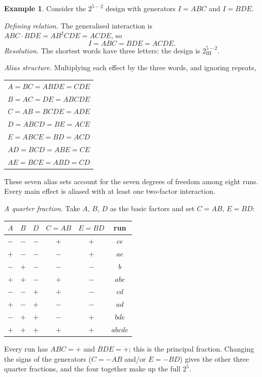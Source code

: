 \documentclass[11pt,a4paper]{article}
\numberwithin{equation}{section}
\theoremstyle{definition}
\newtheorem{exa}[thm]{Example}
\begin{document}
\begin{exa}\label{exa:quarter}
Consider the $2^{5-2}$ design with generators $I = ABC$ and $I = BDE$.

\emph{Defining relation.} The generalised interaction is $ABC \cdot BDE = AB^2CDE = ACDE$, so
\[
I = ABC = BDE = ACDE .
\]
\emph{Resolution.} The shortest words have three letters: the design is $2^{5-2}_{\mathrm{III}}$.

\emph{Alias structure.} Multiplying each effect by the three words, and ignoring repeats,
\begin{center}
\begin{tabular}{l}
$A = BC = ABDE = CDE$ \\
$B = AC = DE = ABCDE$ \\
$C = AB = BCDE = ADE$ \\
$D = ABCD = BE = ACE$ \\
$E = ABCE = BD = ACD$ \\
$AD = BCD = ABE = CE$ \\
$AE = BCE = ABD = CD$
\end{tabular}
\end{center}
These seven alias sets account for the seven degrees of freedom among eight runs. Every main effect is aliased with at least one two-factor
interaction.

\emph{A quarter fraction.} Take $A$, $B$, $D$ as the basic factors and set $C = AB$, $E = BD$:
\begin{center}
\begin{tabular}{ccc|cc|c}
$A$ & $B$ & $D$ & $C = AB$ & $E = BD$ & run \\
\hline
$-$ & $-$ & $-$ & $+$ & $+$ & $ce$ \\
$+$ & $-$ & $-$ & $-$ & $+$ & $ae$ \\
$-$ & $+$ & $-$ & $-$ & $-$ & $b$ \\
$+$ & $+$ & $-$ & $+$ & $-$ & $abc$ \\
$-$ & $-$ & $+$ & $+$ & $-$ & $cd$ \\
$+$ & $-$ & $+$ & $-$ & $-$ & $ad$ \\
$-$ & $+$ & $+$ & $-$ & $+$ & $bde$ \\
$+$ & $+$ & $+$ & $+$ & $+$ & $abcde$
\end{tabular}
\end{center}
Every run has $ABC = +$ and $BDE = +$; this is the principal fraction. Changing the signs of the generators ($C = -AB$ and/or $E = -BD$) gives the other
three quarter fractions, and the four together make up the full $2^5$.
\end{exa}
\end{document}
